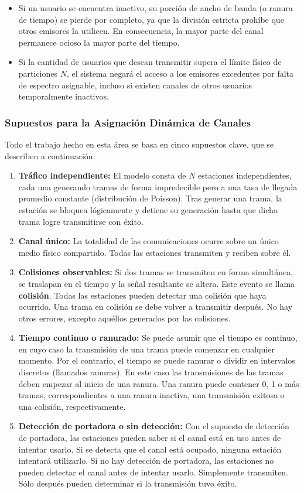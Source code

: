 \begin{itemize}
  \item Si un usuario se encuentra inactivo, su porción de ancho de banda (o ranura de tiempo) se pierde por completo, ya que la división estricta prohíbe que otros emisores la utilicen. En consecuencia, la mayor parte del canal permanece ocioso la mayor parte del tiempo.
  \item Si la cantidad de usuarios que desean transmitir supera el límite físico de particiones $N$, el sistema negará el acceso a los emisores excedentes por falta de espectro asignable, incluso si existen canales de otros usuarios temporalmente inactivos.
\end{itemize}

\subsubsection{Supuestos para la Asignación Dinámica de Canales}

Todo el trabajo hecho en esta área se basa en cinco supuestos clave, que se describen a continuación:

\begin{enumerate}
    \item \textbf{Tráfico independiente:} El modelo consta de $N$ estaciones independientes, cada una generando tramas de forma impredecible pero a una tasa de llegada promedio constante (distribución de Poisson). Tras generar una trama, la estación se bloquea lógicamente y detiene su generación hasta que dicha trama logre transmitirse con éxito.
    \item \textbf{Canal único:} La totalidad de las comunicaciones ocurre sobre un único medio físico compartido. Todas las estaciones transmiten y reciben sobre él.
    \item \textbf{Colisiones observables:} Si dos tramas se transmiten en forma simultánea, se traslapan en el tiempo y la señal resultante se altera. Este evento se llama \textbf{colisión}. Todas las estaciones pueden detectar una colisión que haya ocurrido. Una trama en colisión se debe volver a transmitir después. No hay otros errores, excepto aquéllos generados por las colisiones.
    \item \textbf{Tiempo continuo o ranurado:} Se puede asumir que el tiempo es continuo, en cuyo caso la transmisión de una trama puede comenzar en cualquier momento. Por el contrario, el tiempo se puede ranurar o dividir en intervalos discretos (llamados ranuras). En este caso las transmisiones de las tramas deben empezar al inicio de una ranura. Una ranura puede contener 0, 1 o más tramas, correspondientes a una ranura inactiva, una transmisión exitosa o una colisión, respectivamente. 
    \item \textbf{Detección de portadora o sin detección:} Con el supuesto de detección de portadora, las estaciones pueden saber si el canal está en uso antes de intentar usarlo. Si se detecta que el canal está ocupado, ninguna estación intentará utilizarlo. Si no hay detección de portadora, las estaciones no pueden detectar el canal antes de intentar usarlo. Simplemente transmiten. Sólo después pueden determinar si la transmisión tuvo éxito.
\end{enumerate}

